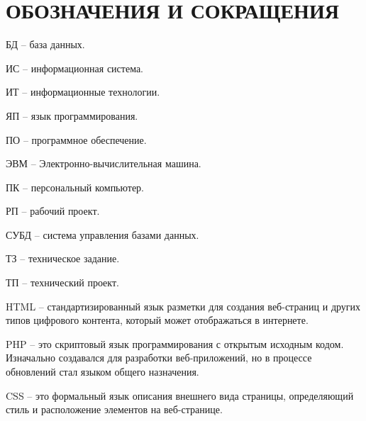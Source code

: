\section*{ОБОЗНАЧЕНИЯ И СОКРАЩЕНИЯ}

БД -- база данных.

ИС -- информационная система.

ИТ -- информационные технологии. 

ЯП -- язык программирования.

ПО -- программное обеспечение.

ЭВМ -- Электронно-вычислительная машина.

ПК -- персональный компьютер.

РП -- рабочий проект.

СУБД -- система управления базами данных.

ТЗ -- техническое задание.

ТП -- технический проект.

HTML -- стандартизированный язык разметки для создания веб-страниц и других типов цифрового контента, который может отображаться в интернете.

PHP --  это скриптовый язык программирования с открытым исходным кодом. Изначально создавался для разработки веб-приложений, но в процессе обновлений стал языком общего назначения.

CSS -- это формальный язык описания внешнего вида страницы, определяющий стиль и расположение элементов на веб-странице.
